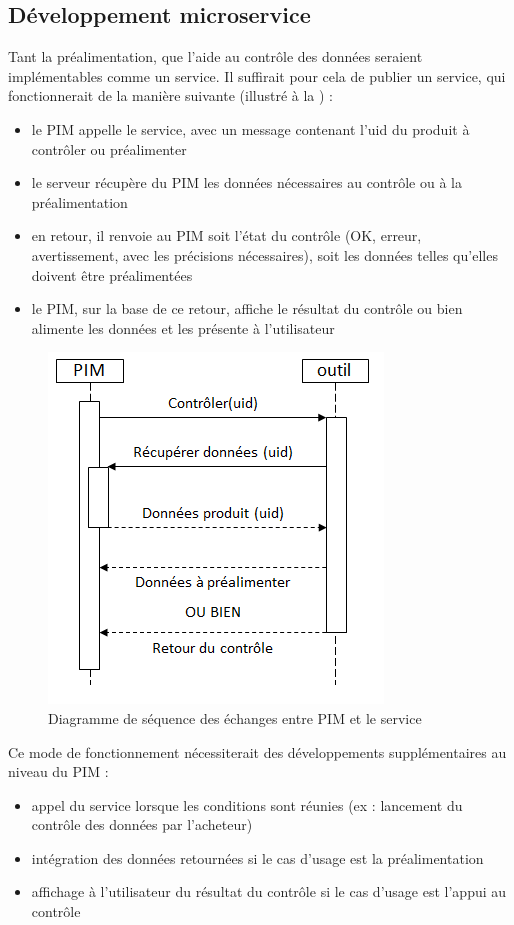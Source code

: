             \subsection{Développement microservice}

            Tant la préalimentation, que l'aide au contrôle des données seraient implémentables comme un service.
            Il suffirait pour cela de publier un service, qui fonctionnerait de la manière suivante (illustré à la ) : 
            \begin{itemize}
                \item le PIM appelle le service, avec un message contenant l'uid du produit à contrôler ou préalimenter
                \item le serveur récupère du PIM les données nécessaires au contrôle ou à la préalimentation
                \item en retour, il renvoie au PIM soit l'état du contrôle (OK, erreur, avertissement, avec les précisions nécessaires), soit les données telles qu'elles doivent être préalimentées
                \item le PIM, sur la base de ce retour, affiche le résultat du contrôle ou bien alimente les données et les présente à l'utilisateur
            \end{itemize}

            \begin{figure}[htbp]
                \begin{center}
                \includegraphics[width=0.4\linewidth]{img/sequence_diag.png}
                \end{center}
                \caption{Diagramme de séquence des échanges entre PIM et le service}
                \label{fig:sequence_diag}
            \end{figure}

            Ce mode de fonctionnement nécessiterait des développements supplémentaires au niveau du PIM : 
            \begin{itemize}
                \item appel du service lorsque les conditions sont réunies (ex : lancement du contrôle des données par l'acheteur)
                \item intégration des données retournées si le cas d'usage est la préalimentation
                \item affichage à l'utilisateur du résultat du contrôle si le cas d'usage est l'appui au contrôle
            \end{itemize}

